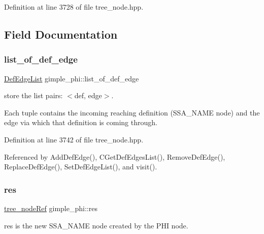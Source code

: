 Definition at line 3728 of file tree\+\_\+node.\+hpp.



\subsection{Field Documentation}
\mbox{\label{structgimple__phi_a33d413a383d6b97621c970489d7af257}} 
\subsubsection{\texorpdfstring{list\+\_\+of\+\_\+def\+\_\+edge}{list\_of\_def\_edge}}
{\footnotesize\ttfamily \hyperlink{structgimple__phi_abaf4e51c9be92bf7efbf5aaaab82f386}{Def\+Edge\+List} gimple\+\_\+phi\+::list\+\_\+of\+\_\+def\+\_\+edge\hspace{0.3cm}{\ttfamily [private]}}



store the list pairs\+: $<$def, edge$>$. 

Each tuple contains the incoming reaching definition (S\+S\+A\+\_\+\+N\+A\+ME node) and the edge via which that definition is coming through. 

Definition at line 3742 of file tree\+\_\+node.\+hpp.



Referenced by Add\+Def\+Edge(), C\+Get\+Def\+Edges\+List(), Remove\+Def\+Edge(), Replace\+Def\+Edge(), Set\+Def\+Edge\+List(), and visit().

\mbox{\label{structgimple__phi_a6b3ee3b0f107f7b738121116aae06fc0}} 
\subsubsection{\texorpdfstring{res}{res}}
{\footnotesize\ttfamily \hyperlink{tree__node_8hpp_a6ee377554d1c4871ad66a337eaa67fd5}{tree\+\_\+node\+Ref} gimple\+\_\+phi\+::res}



res is the new S\+S\+A\+\_\+\+N\+A\+ME node created by the P\+HI node. 



